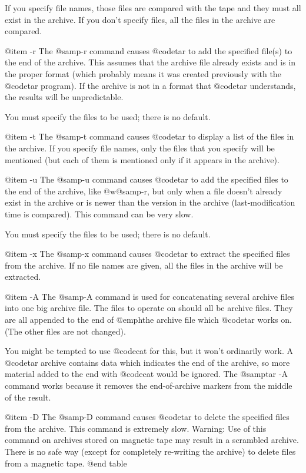If you specify file names, those files are compared with the tape and
they must all exist in the archive.  If you don't specify files, all
the files in the archive are compared.

@item -r
The @samp{-r} command causes @code{tar} to add the specified file(s)
to the end of the archive.  This assumes that the archive file already
exists and is in the proper format (which probably means it was
created previously with the @code{tar} program).  If the archive is
not in a format that @code{tar} understands, the results will be
unpredictable.

You must specify the files to be used; there is no default.

@item -t
The @samp{-t} command causes @code{tar} to display a list of the files
in the archive.  If you specify file names, only the files
that you specify will be mentioned (but each of them is mentioned only
if it appears in the archive).

@item -u
The @samp{-u} command causes @code{tar} to add the specified files to
the end of the archive, like @w{@samp{-r}}, but only when a file doesn't
already exist in the archive or is newer than the version in the
archive (last-modification time is compared).  This command can be
very slow.

You must specify the files to be used; there is no default.

@item -x
The @samp{-x} command causes @code{tar} to extract the specified files
from the archive.  If no file names are given, all the files in the
archive will be extracted.

@item -A
The @samp{-A} command is used for concatenating several archive files
into one big archive file.  The files to operate on should all be
archive files.  They are all appended to the end of @emph{the} archive
file which @code{tar} works on.  (The other files are not changed).

You might be tempted to use @code{cat} for this, but it won't
ordinarily work.  A @code{tar} archive contains data which indicates
the end of the archive, so more material added to the end with
@code{cat} would be ignored.  The @samp{tar -A} command works because
it removes the end-of-archive markers from the middle of the result.

@item -D
The @samp{-D} command causes @code{tar} to delete the specified files
from the archive.  This command is extremely slow.  Warning:  Use of
this command on archives stored on magnetic tape may result in a
scrambled archive.  There is no safe way (except for completely
re-writing the archive) to delete files from a magnetic tape.
@end table

